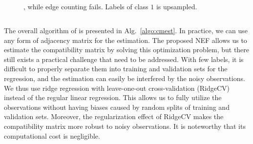 

\begin{figure}[t]
    \centering
    \vspace{-3mm}
    \caption{\label{fig:ecex} \underline{}, while edge counting fails. Labels of class $1$ is upsampled.}
    \vspace{-3mm}
\end{figure}

\subsection{\methodest}
The overall algorithm of \methodest is presented in Alg.~\ref{algo:cmest}.
In practice, we can use any form of adjacency matrix for the estimation.
The proposed NEF allows us to estimate the compatibility matrix by solving this optimization problem, but there still exists a practical challenge that need to be addressed.
With few labels, it is difficult to properly separate them into training and validation sets for the regression, and the estimation can easily be interfered by the noisy observations.
We thus use ridge regression with leave-one-out cross-validation (RidgeCV) instead of the regular linear regression.
This allows us to fully utilize the observations without having biases caused by random splits of training and validation sets.
Moreover, the regularization effect of RidgeCV makes the compatibility matrix more robust to noisy observations.
It is noteworthy that its computational cost is negligible.

